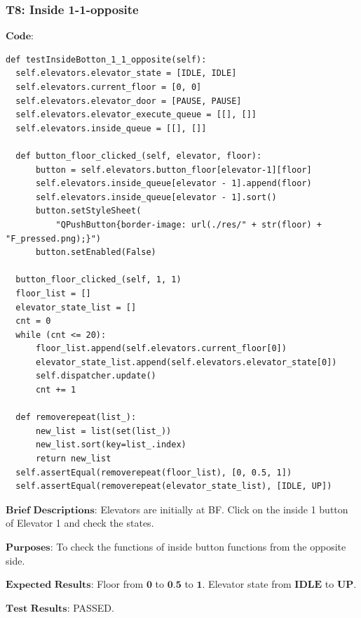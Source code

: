 \documentclass{article}
\begin{document}
\subsubsection*{T8: Inside 1-1-opposite}
$\textbf{Code:}$
\begin{lstlisting}
def testInsideBotton_1_1_opposite(self):
  self.elevators.elevator_state = [IDLE, IDLE]
  self.elevators.current_floor = [0, 0]
  self.elevators.elevator_door = [PAUSE, PAUSE]
  self.elevators.elevator_execute_queue = [[], []]
  self.elevators.inside_queue = [[], []]

  def button_floor_clicked_(self, elevator, floor):
      button = self.elevators.button_floor[elevator-1][floor]
      self.elevators.inside_queue[elevator - 1].append(floor)
      self.elevators.inside_queue[elevator - 1].sort()
      button.setStyleSheet(
          "QPushButton{border-image: url(./res/" + str(floor) + "F_pressed.png);}")
      button.setEnabled(False)

  button_floor_clicked_(self, 1, 1)
  floor_list = []
  elevator_state_list = []
  cnt = 0
  while (cnt <= 20):
      floor_list.append(self.elevators.current_floor[0])
      elevator_state_list.append(self.elevators.elevator_state[0])
      self.dispatcher.update()
      cnt += 1

  def removerepeat(list_):
      new_list = list(set(list_))
      new_list.sort(key=list_.index)
      return new_list
  self.assertEqual(removerepeat(floor_list), [0, 0.5, 1])
  self.assertEqual(removerepeat(elevator_state_list), [IDLE, UP])
\end{lstlisting}

$\textbf{Brief Descriptions:}$
Elevators are initially at BF. Click on the inside 1 button of Elevator 1 and check the states.

$\textbf{Purposes:}$
To check the functions of inside button functions from the opposite side.

$\textbf{Expected Results:}$
Floor from $\textbf{0}$ to $\textbf{0.5}$ to $\textbf{1}$. Elevator state from $\textbf{IDLE}$ to $\textbf{UP}$.

$\textbf{Test Results:}$
PASSED.
\end{document}
